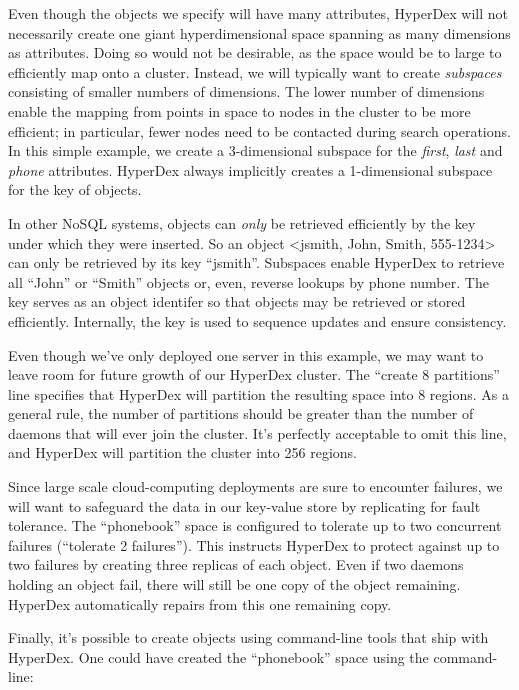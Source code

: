 Even though the objects we specify will have many attributes, HyperDex will not
necessarily create one giant hyperdimensional space spanning as many dimensions
as attributes.  Doing so would not be desirable, as the space would be to large
to efficiently map onto a cluster.  Instead, we will typically want to create
{\em subspaces} consisting of smaller numbers of dimensions. The lower number of
dimensions enable the mapping from points in space to nodes in the cluster to be
more efficient; in particular, fewer nodes need to be contacted during search
operations.  In this simple example, we create a 3-dimensional subspace for the
{\em first}, {\em last} and {\em phone} attributes.  HyperDex always implicitly
creates a 1-dimensional subspace for the key of objects.

In other NoSQL systems, objects can {\em only} be retrieved efficiently by the
key under which they were inserted.  So an object <jsmith, John, Smith,
555-1234> can only be retrieved by its key ``jsmith''.  Subspaces enable
HyperDex to retrieve all ``John'' or ``Smith'' objects or, even, reverse lookups
by phone number.  The key serves as an object identifer so that objects may be
retrieved or stored efficiently.  Internally, the key is used to sequence
updates and ensure consistency.

Even though we've only deployed one server in this example, we may want to leave
room for future growth of our HyperDex cluster.  The ``create 8 partitions''
line specifies that HyperDex will partition the resulting space into 8 regions.
As a general rule, the number of partitions should be greater than the number of
daemons that will ever join the cluster.  It's perfectly acceptable to omit this
line, and HyperDex will partition the cluster into 256 regions.

Since large scale cloud-computing deployments are sure to encounter failures, we
will want to safeguard the data in our key-value store by replicating for fault
tolerance.  The ``phonebook'' space is configured to tolerate up to two
concurrent failures (``tolerate 2 failures'').  This instructs HyperDex to
protect against up to two failures by creating three replicas of each object.
Even if two daemons holding an object fail, there will still be one copy of the
object remaining.  HyperDex automatically repairs from this one remaining copy.

Finally, it's possible to create objects using command-line tools that ship with
HyperDex.  One could have created the ``phonebook'' space using the
command-line:

